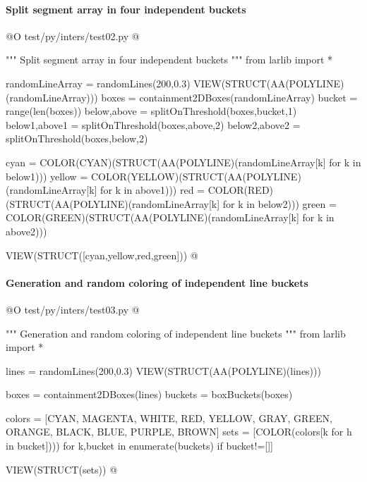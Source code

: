\documentclass[11pt,oneside]{article}    %
\begin{document}
\paragraph{Split segment array in four independent buckets}
@O test/py/inters/test02.py
@{""" Split segment array in four independent buckets """
from larlib import *

randomLineArray = randomLines(200,0.3)
VIEW(STRUCT(AA(POLYLINE)(randomLineArray)))
boxes = containment2DBoxes(randomLineArray)
bucket = range(len(boxes))
below,above = splitOnThreshold(boxes,bucket,1)
below1,above1 = splitOnThreshold(boxes,above,2)
below2,above2 = splitOnThreshold(boxes,below,2)

cyan = COLOR(CYAN)(STRUCT(AA(POLYLINE)(randomLineArray[k] for k in below1)))
yellow = COLOR(YELLOW)(STRUCT(AA(POLYLINE)(randomLineArray[k] for k in above1)))
red = COLOR(RED)(STRUCT(AA(POLYLINE)(randomLineArray[k] for k in below2)))
green = COLOR(GREEN)(STRUCT(AA(POLYLINE)(randomLineArray[k] for k in above2)))

VIEW(STRUCT([cyan,yellow,red,green]))
@}



\paragraph{Generation and random coloring of independent line buckets}
@O test/py/inters/test03.py
@{""" Generation and random coloring of independent line buckets """
from larlib import *

lines = randomLines(200,0.3)
VIEW(STRUCT(AA(POLYLINE)(lines)))

boxes = containment2DBoxes(lines)
buckets = boxBuckets(boxes)

colors = [CYAN, MAGENTA, WHITE, RED, YELLOW, GRAY, GREEN, ORANGE, BLACK, BLUE, PURPLE, BROWN]
sets = [COLOR(colors[k%
            for h in bucket]))) for k,bucket in enumerate(buckets) if bucket!=[]]

VIEW(STRUCT(sets))
@}
\end{document}
